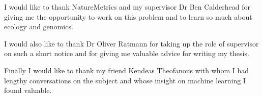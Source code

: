 
\begin{acknowledgements}      


I would like to thank NatureMetrics and my supervisor Dr Ben Calderhead for giving me the opportunity to work on this problem and to learn so much about ecology and genomics.

I would also like to thank Dr Oliver Ratmann for taking up the role of supervisor on such a short notice and for giving me valuable advice for writing my thesis.

Finally I would like to thank my friend Kendeas Theofanous with whom I had lengthy conversations on the subject and whose insight on machine learning I found valuable.


\end{acknowledgements}
